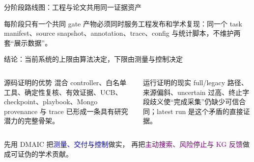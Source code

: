 \begin{frame}{分阶段路线图：工程与论文共用同一证据资产}
\centering
{}

\vspace{1em}
\begin{block}{每阶段只有一个共同 gate}
产物必须同时服务工程发布和学术复现：同一个 task manifest、source snapshot、annotation、trace、config 与统计脚本，不维护两套“展示数据”。
\end{block}
\end{frame}

\begin{frame}{结论：当前系统的上限由算法决定，下限由测量与控制决定}
\begin{columns}[T,onlytextwidth]
\begin{exampleblock}{源码证明的优势}
混合 controller、白名单工具、确定性复核、有效证据、UCB、checkpoint、playbook、Mongo provenance 与 trace 已形成一条具有研究潜力的完整骨架。
\end{exampleblock}
\begin{alertblock}{运行证明的现实}
full/legacy 路径、来源偏斜、uncertain 过高、终止字段歧义使“完成采集”仍缺少可信合同；latest run 是这个矛盾的直接证据。
\end{alertblock}
\end{columns}

\vspace{1em}
\begin{center}
\begin{minipage}{0.86\textwidth}
\Large\centering
先用 DMAIC 把\textcolor{Blue}{测量、交付与控制}做实，
再把\textcolor{Purple}{主动搜索、风险停止与 KG 反馈}做成可证伪的学术贡献。
\end{minipage}
\end{center}
\end{frame}


